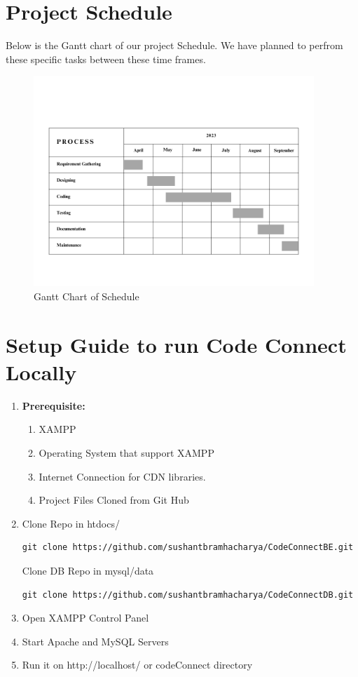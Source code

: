 \section{Project Schedule}
Below is the Gantt chart of our project Schedule. We have planned to perfrom these specific tasks between these time frames.
\begin{figure}[H]
    \centering
        \includegraphics[width=400px]{Diagrams/Gantt_Chart.png}
    \caption{Gantt Chart of Schedule}
\end{figure}

\section{Setup Guide to run Code Connect Locally}
\begin{enumerate}
    \item \textbf{Prerequisite:}
    \begin{enumerate}
        \item XAMPP
        \item Operating System that support XAMPP
        \item Internet Connection for CDN libraries.
        \item Project Files Cloned from Git Hub
    \end{enumerate}
    \item Clone Repo in htdocs/\\
    \begin{verbatim}
git clone https://github.com/sushantbramhacharya/CodeConnectBE.git
    \end{verbatim}
    Clone DB Repo in mysql/data\\
    \begin{verbatim}
git clone https://github.com/sushantbramhacharya/CodeConnectDB.git
    \end{verbatim}
    \item Open XAMPP Control Panel
    \item Start Apache and MySQL Servers
    \item Run it on http://localhost/ or codeConnect directory
\end{enumerate}


